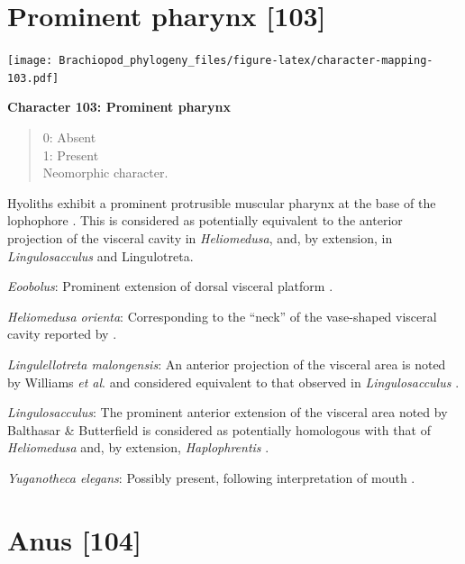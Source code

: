 \documentclass[openany]{book}
\theoremstyle{definition}
\theoremstyle{definition}
\theoremstyle{definition}
\theoremstyle{remark}
\begin{document}
\section{Prominent pharynx {[}103{]}}\label{prominent-pharynx-103}

\texttt{[image: Brachiopod\_phylogeny\_files/figure-latex/character-mapping-103.pdf]}

\textbf{Character 103: Prominent pharynx}

\begin{quote}
0: Absent\\
1: Present\\
Neomorphic character.
\end{quote}

Hyoliths exhibit a prominent protrusible muscular pharynx at the base of
the lophophore \citep{Moysiuk2017Hyolithsare}. This is considered as
potentially equivalent to the anterior projection of the visceral cavity
in \emph{Heliomedusa}, and, by extension, in \emph{Lingulosacculus} and
Lingulotreta.

\hypertarget{Eoobolus-coding-103}{}
\emph{Eoobolus}: Prominent extension of dorsal visceral platform
\citep{Balthasar2009Thebrachiopod}.

\hypertarget{Heliomedusa_orienta-coding-103}{}
\emph{Heliomedusa orienta}: Corresponding to the ``neck'' of the
vase-shaped visceral cavity reported by
\citet{Zhang2009Architectureand}.

\hypertarget{Lingulellotreta_malongensis-coding-103}{}
\emph{Lingulellotreta malongensis}: An anterior projection of the
visceral area is noted by Williams \emph{et al}.
\citeyearpar{Williams2000LinguliformeaCraniiformea} and considered
equivalent to that observed in \emph{Lingulosacculus}
\citep{Balthasar2009EarlyCambrian}.

\hypertarget{Lingulosacculus-coding-103}{}
\emph{Lingulosacculus}: The prominent anterior extension of the visceral
area noted by Balthasar \& Butterfield
\citeyearpar{Balthasar2009EarlyCambrian} is considered as potentially
homologous with that of \emph{Heliomedusa}
\citep{Zhang2009Architectureand} and, by extension, \emph{Haplophrentis}
\citep{Moysiuk2017Hyolithsare}.

\hypertarget{Yuganotheca_elegans-coding-103}{}
\emph{Yuganotheca elegans}: Possibly present, following interpretation
of mouth \citep[see fig. 2c, d in][]{Zhang2014Anearly}.

\section{Anus {[}104{]}}\label{anus-104}
\end{document}
